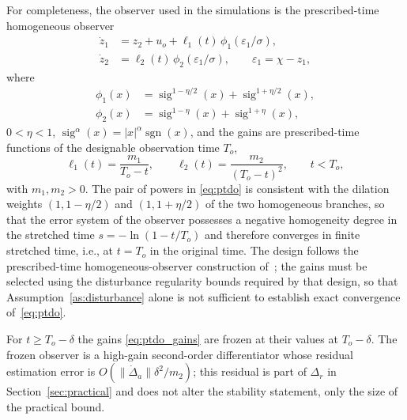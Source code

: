 For completeness, the observer used in the simulations is the prescribed-time
homogeneous observer
\begin{equation}
\begin{aligned}
 \dot z_1&=z_2+u_o+\ell_1(t)\,\phi_1(\varepsilon_1/\sigma),\\
 \dot z_2&=\ell_2(t)\,\phi_2(\varepsilon_1/\sigma),
 \qquad \varepsilon_1=\chi-z_1,
\end{aligned}\label{eq:ptdo}
\end{equation}
where
\begin{align}
 \phi_1(x)&=\operatorname{sig}^{1-\eta/2}(x)+
             \operatorname{sig}^{1+\eta/2}(x),\\
 \phi_2(x)&=\operatorname{sig}^{1-\eta}(x)+
             \operatorname{sig}^{1+\eta}(x),
 \end{align}
$0<\eta<1$, $\operatorname{sig}^{\alpha}(x)=|x|^{\alpha}\operatorname{sgn}(x)$, and
the gains are prescribed-time functions of the designable observation time $T_o$,
\begin{equation}
 \ell_1(t)=\frac{m_1}{T_o-t},\qquad
 \ell_2(t)=\frac{m_2}{(T_o-t)^2},\qquad t<T_o,
 \label{eq:ptdo_gains}
\end{equation}
with $m_1,m_2>0$. The pair of powers in \eqref{eq:ptdo} is consistent with the
dilation weights $(1,1-\eta/2)$ and $(1,1+\eta/2)$ of the two homogeneous
branches, so that the error system of the observer possesses a negative
homogeneity degree in the stretched time
$s=-\ln(1-t/T_o)$ and therefore converges in finite stretched time, i.e., at
$t=T_o$ in the original time. The design follows the prescribed-time
homogeneous-observer construction of~\cite{jiangPrescribedtimeDisturbanceObserver2024};
the gains must be selected using the disturbance regularity bounds required by
that design, so that Assumption~\ref{as:disturbance} alone is not sufficient to
establish exact convergence of~\eqref{eq:ptdo}.
\begin{remark}
For $t\ge T_o-\delta$ the gains \eqref{eq:ptdo_gains} are frozen at their values
at $T_o-\delta$. The frozen observer is a high-gain second-order differentiator
whose residual estimation error is $O(\|\dot\Delta_a\|\delta^2/m_2)$; this
residual is part of $\Delta_r$ in Section~\ref{sec:practical} and does not alter
the stability statement, only the size of the practical bound.
\end{remark}

